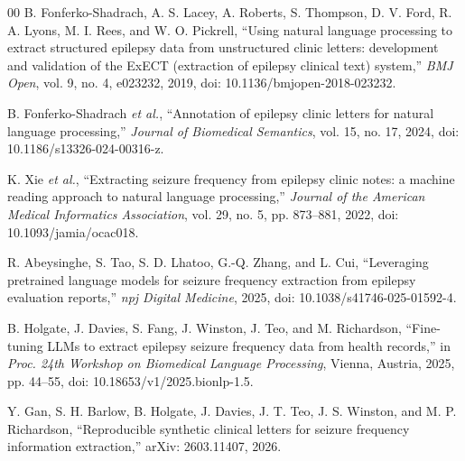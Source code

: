 \documentclass[conference]{IEEEtran}
\begin{document}
\begin{thebibliography}{00}
\scriptsize
{} B. Fonferko-Shadrach, A. S. Lacey, A. Roberts,
S. Thompson, D. V. Ford, R. A. Lyons, M. I. Rees, and W. O. Pickrell, ``Using
natural language processing to extract structured epilepsy data from
unstructured clinic letters: development and validation of the ExECT
(extraction of epilepsy clinical text) system,'' \emph{BMJ Open}, vol. 9,
no. 4, e023232, 2019, doi: 10.1136/bmjopen-2018-023232.

 B. Fonferko-Shadrach \emph{et al.},
``Annotation of epilepsy clinic letters for natural language processing,''
\emph{Journal of Biomedical Semantics}, vol. 15, no. 17, 2024, doi:
10.1186/s13326-024-00316-z.

 K. Xie \emph{et al.}, ``Extracting seizure frequency
from epilepsy clinic notes: a machine reading approach to natural language
processing,'' \emph{Journal of the American Medical Informatics Association},
vol. 29, no. 5, pp. 873--881, 2022, doi: 10.1093/jamia/ocac018.

 R. Abeysinghe, S. Tao, S. D. Lhatoo,
G.-Q. Zhang, and L. Cui, ``Leveraging pretrained language models for seizure
frequency extraction from epilepsy evaluation reports,'' \emph{npj Digital
Medicine}, 2025, doi: 10.1038/s41746-025-01592-4.

 B. Holgate, J. Davies, S. Fang, J. Winston,
J. Teo, and M. Richardson, ``Fine-tuning LLMs to extract epilepsy seizure
frequency data from health records,'' in \emph{Proc. 24th Workshop on
Biomedical Language Processing}, Vienna, Austria, 2025, pp. 44--55, doi:
10.18653/v1/2025.bionlp-1.5.

 Y. Gan, S. H. Barlow, B. Holgate, J. Davies,
J. T. Teo, J. S. Winston, and M. P. Richardson, ``Reproducible synthetic
clinical letters for seizure frequency information extraction,'' arXiv:
2603.11407, 2026.
\end{thebibliography}
\end{document}
